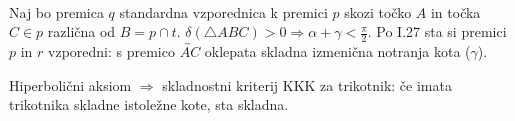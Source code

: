 \begin{dokaz}
            \\ Naj bo premica $q$ standardna vzporednica k premici $p$ skozi točko $A$ in točka $C\in p$ različna od $B=p\cap t$. $\delta(\triangle ABC)>0 \Rightarrow \alpha+\gamma<\frac{\pi}{2}$. Po I.27 sta si premici $p$ in $r$ vzporedni: s premico $\overleftrightarrow{AC}$ oklepata skladna izmenična notranja kota ($\gamma$).
        \end{dokaz}

    \begin{trditev}[KKK]
        Hiperbolični aksiom $\Rightarrow$ skladnostni kriterij KKK za trikotnik: če imata trikotnika skladne istoležne kote, sta skladna.
    \end{trditev}

